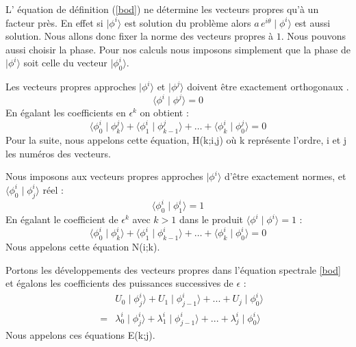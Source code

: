 \documentclass[12pt]{book}
\begin{document}
L' \'equation de d\'efinition (\ref{bod})  ne d\'etermine
les vecteurs propres qu'\`a un facteur pr\`es. 
En effet si $\mid \phi^{i}\rangle $ 
est solution du probl\`eme alors
$a\,e^{i\theta}\mid \phi^{i}\rangle $ est aussi
solution. 
Nous allons donc fixer la norme des vecteurs propres \`a $1$.
Nous pouvons aussi choisir la phase. Pour nos calculs nous imposons
simplement que la phase de $\mid \phi^{i}\rangle $ soit celle du vecteur
$\mid \phi^{i}_0\rangle $.

Les vecteurs propres approches $\mid \phi^{i}\rangle $ et 
$\mid \phi^{j}\rangle $ doivent
\^etre exactement orthogonaux .
\begin{equation} 
\langle \phi^{i}\mid \phi^{j}\rangle =0 
\end{equation}
En \'egalant les coefficients en $\epsilon^k$ on obtient :
\begin{equation}
\langle \phi^{i}_{0}\mid \phi^{j}_{k}\rangle +\langle \phi^{i}_{1}\mid
\phi^{j}_{k-1}\rangle +\ldots+\langle \phi^{i}_{k}\mid
\phi^{j}_{0}\rangle =0 
\end{equation}
%
Pour la suite, nous appelons cette \'equation, H(k;i,j) o\`u k
repr\'esente l'ordre, i et j les num\'eros des vecteurs.


Nous imposons aux vecteurs propres approches $\mid \phi^{i}\rangle $ 
d'\^etre exactement normes, et
$\langle \phi^{i}_{0}\mid \phi^{i}_{j}\rangle $ r\'eel :
\begin{equation} 
\langle \phi^{i}_{0}\mid \phi^{i}_{1}\rangle =1 
\end{equation}
En \'egalant le coefficient de $\epsilon^k$ avec $k > 1$ 
dans le produit
$\langle \phi^{i}\mid \phi^{i}\rangle =1 $ :
\begin{equation}
\langle \phi^{i}_{0}\mid \phi^{i}_{k}\rangle +\langle \phi^{i}_{1}\mid \phi^{i}_{k-1}\rangle +\ldots+\langle \phi^{i}_{k}\mid \phi^{i}_{0}\rangle =0
\end{equation}
Nous appelons cette \'equation N(i;k).


Portons les d\'eveloppements des vecteurs propres dans l'\'equation
spectrale \ref{bod} et \'egalons les coefficients des puissances 
successives de $\epsilon$ :
\begin{eqnarray}
&&U_{0}\mid \phi^{i}_{j}\rangle +U_{1}\mid \phi^{i}_{j-1}\rangle +...+U_{j}\mid \phi^{i}_{0}\rangle \nonumber\\
&=&\lambda_{0}^{i}\mid \phi^{i}_{j}\rangle +\lambda_{1}^{i}\mid \phi^{i}_{j-1}\rangle +...
+\lambda_{j}^{i}\mid \phi^{i}_{0}\rangle  \label{oivj}
\end{eqnarray}
Nous appelons ces \'equations E(k;j).
\end{document}
